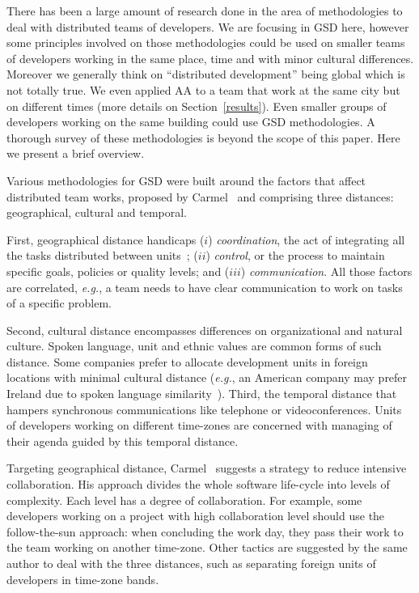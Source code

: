 \documentclass{article}
\newcommand{\eg}{{\it e.g.}}
\newcommand{\indraftnote}[1]{}
\newcommand{\todo}[1]{\indraftnote{todo: #1}}
\begin{document}


There has been a large amount of research done in the area of
methodologies to deal with distributed teams of developers. We are
focusing in GSD here, however some principles involved on those
methodologies could be used on smaller teams of developers working in
the same place, time and with minor cultural differences. Moreover we
generally think on ``distributed development'' being global which is
not totally true. We even applied AA to a team that work at the same
city but on different times (more details on
Section~\ref{results}). Even smaller groups of developers working on
the same building could use GSD methodologies. A thorough survey of
these methodologies is beyond the scope of this paper. Here we present
a brief overview.

Various methodologies for GSD were built around the factors that
affect distributed team works, proposed by Carmel~\cite{carmel1999}
and comprising three distances: geographical, cultural and
temporal. 

First, geographical distance handicaps ($i$) \emph{coordination}, the act of
integrating all the tasks distributed between units~\cite{carmel2001}; ($ii$)
\emph{control}, or the process to maintain specific goals, policies or quality
levels; and ($iii$) \emph{communication}. All those factors are correlated, \eg,
a team needs to have clear communication to work on tasks of a specific problem.  

Second, cultural distance encompasses differences on organizational and
natural culture. Spoken language, unit and ethnic values are common
forms of such distance. Some companies prefer to allocate development
units in foreign locations with minimal cultural distance (\eg, an
American company may prefer Ireland due to spoken language
similarity~\cite{carmel2001}). Third, the temporal distance that
hampers synchronous communications like telephone or
videoconferences. Units of developers working on different time-zones
are concerned with managing of their agenda guided by this temporal
distance.

Targeting geographical distance, Carmel~\cite{carmel2001} suggests a
strategy to reduce intensive collaboration. His approach divides the
whole software life-cycle into levels of complexity. Each level has a
degree of collaboration. For example, some developers working on a
project with high collaboration level should use the follow-the-sun
approach: when concluding the work day, they pass their work to the
team working on another time-zone. Other tactics are suggested by the
same author to deal with the three distances, such as separating foreign
units of developers in time-zone bands.
\end{document}
